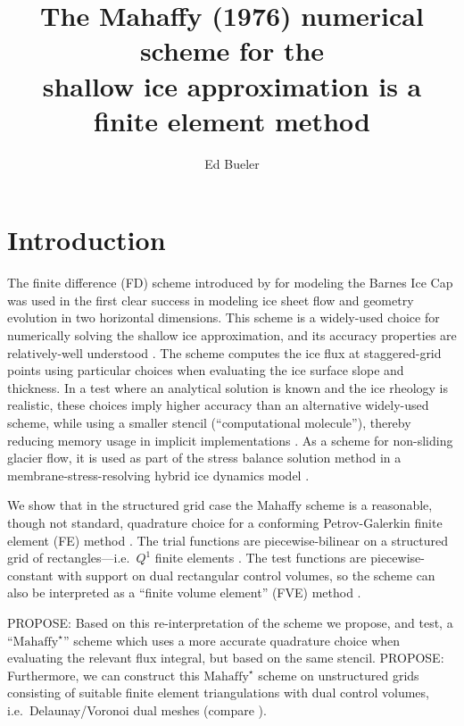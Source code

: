 \documentclass[11pt]{amsart}
\title[The Mahaffy scheme is a finite element method]{The Mahaffy (1976) numerical scheme for the \\ shallow ice approximation is a finite element method}
\author{Ed Bueler}
\newcommand{\Mstar}{$\text{Mahaffy}^\star$\xspace}
\begin{document}

\maketitle

\thispagestyle{empty}


\section{Introduction}

The finite difference (FD) scheme introduced by \cite{Mahaffy1976} for modeling the Barnes Ice Cap was used in the first clear success in modeling ice sheet flow and geometry evolution in two horizontal dimensions.  This scheme is a widely-used choice for numerically solving the shallow ice approximation, and its accuracy properties are relatively-well understood \cite{Bueleretal2005}.   The scheme computes the ice flux at staggered-grid points using particular choices when evaluating the ice surface slope and thickness.  In a test where an analytical solution is known and the ice rheology is realistic, these choices imply higher accuracy than an alternative widely-used scheme, while using a smaller stencil (``computational molecule''), thereby reducing memory usage in implicit implementations \cite{HindmarshPayne1996}.  As a scheme for non-sliding glacier flow, it is used as part of the stress balance solution method in a membrane-stress-resolving hybrid ice dynamics model \cite{BuelerBrown2009}.

We show that in the structured grid case the Mahaffy scheme is a reasonable, though not standard, quadrature choice for a conforming Petrov-Galerkin finite element (FE) method \cite{Elmanetal2005}.  The trial functions are piecewise-bilinear on a structured grid of rectangles---i.e.~$Q^1$ finite elements \cite{Elmanetal2005}.  The test functions are piecewise-constant with support on dual rectangular control volumes, so the scheme can also be interpreted as a ``finite volume element'' (FVE) method \cite{EwingLinLin2002}.

PROPOSE: Based on this re-interpretation of the scheme we propose, and test, a ``\Mstar'' scheme which uses a more accurate quadrature choice when evaluating the relevant flux integral, but based on the same stencil.  PROPOSE: Furthermore, we can construct this \Mstar scheme on unstructured grids consisting of suitable finite element triangulations with dual control volumes, i.e.~Delaunay/Voronoi dual meshes (compare \cite{Ringleretal2013}).
\end{document}
